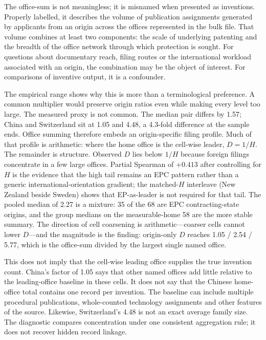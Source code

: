 \documentclass[a4paper,fleqn]{cas-dc}
\begin{document}
The office-sum is not meaningless; it is misnamed when presented as inventions.
Properly labelled, it describes the volume of publication assignments
generated by applicants from an origin across the offices represented in the
bulk file. That volume combines at least two components: the scale of
underlying patenting and the breadth of the office network through which
protection is sought. For questions about documentary reach, filing routes or
the international workload associated with an origin, the combination may be
the object of interest. For comparisons of inventive output, it is a
confounder.

The empirical range shows why this is more than a terminological preference.
A common multiplier would preserve origin ratios even while making every
level too large. The measured proxy is not common. The median pair differs
by 1.57; China and Switzerland sit at 1.05 and 4.48, a 4.3-fold difference
at the sample ends. Office summing therefore embeds an origin-specific filing
profile. Much of that profile is arithmetic: where the home office is the
cell-wise leader, $D=1/H$. The remainder is structure. Observed $D$ lies
below $1/H$ because foreign filings concentrate in a few large offices.
Partial Spearman of $+0.413$ after controlling for $H$ is the evidence that
the high tail remains an EPC pattern rather than a generic
international-orientation gradient; the matched-$H$ interleave (New Zealand
beside Sweden) shows that EP-as-leader is not required for that tail. The
pooled median of 2.27 is a mixture: 35 of the 68 are EPC contracting-state
origins, and the group medians on the measurable-home 58 are the more stable
summary. The
direction of cell coarsening is arithmetic---coarser cells cannot lower
$D$---and the magnitude is the finding: origin-only $D$ reaches 1.05 / 2.54 /
5.77, which is the office-sum divided by the largest single named office.

This does not imply that the cell-wise leading office supplies the true
invention count. China's factor of 1.05 says that other named offices add
little relative to the leading-office baseline in these cells. It does not
say that the Chinese home-office total contains one record per invention.
The baseline can include multiple procedural publications, whole-counted
technology assignments and other features of the source. Likewise,
Switzerland's 4.48 is not an exact average family size. The diagnostic
compares concentration under one consistent aggregation rule; it does not
recover hidden record linkage.
\end{document}
